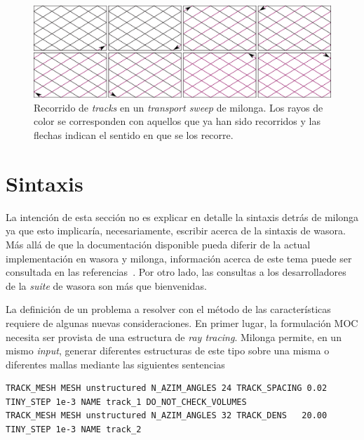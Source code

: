 \documentclass[11pt]{article}
\numberwithin{equation}{section}
\begin{document}
\begin{figure}[!ht]
 \begin{center}
  \includegraphics[width=1.0\linewidth]{graficos/solver/cyclic-tracks-1.pdf}
 \end{center}
\caption{\label{fig:tracks-solver} Recorrido de \emph{tracks} en un \emph{transport sweep} de milonga. Los rayos de color se corresponden con aquellos que ya han sido recorridos y las flechas indican el sentido en que se los recorre.}
\end{figure}


\section{Sintaxis}

La intenci\'on de esta secci\'on no es explicar en detalle la sintaxis detr\'as de milonga ya que esto implicar\'ia, necesariamente, escribir acerca de la sintaxis de wasora. M\'as all\'a de que la documentaci\'on disponible pueda diferir de la actual implementación en wasora y milonga, información acerca de este tema puede ser consultada en las referencias~\cite{wasora, milongabase2010, milonga-db, enief-milonga-2014}. Por otro lado, las consultas a los desarrolladores de la \emph{suite} de wasora son m\'as que bienvenidas. 

La definici\'on de un problema a resolver con el m\'etodo de las características requiere de algunas nuevas consideraciones. En primer lugar, la formulación MOC necesita ser provista de una estructura de \emph{ray tracing}. Milonga permite, en un mismo \emph{input}, generar diferentes estructuras de este tipo sobre una misma o diferentes mallas mediante las siguientes sentencias

\begin{lstlisting}[style=wasora]
TRACK_MESH MESH unstructured N_AZIM_ANGLES 24 TRACK_SPACING 0.02 TINY_STEP 1e-3 NAME track_1 DO_NOT_CHECK_VOLUMES
TRACK_MESH MESH unstructured N_AZIM_ANGLES 32 TRACK_DENS   20.00 TINY_STEP 1e-3 NAME track_2
\end{lstlisting}
\end{document}
